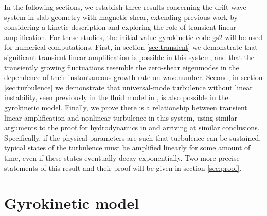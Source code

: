 \documentclass[12pt,superscriptaddress]{revtex4}
\begin{document}
In the following sections, we establish three results concerning the drift wave system in slab geometry
with magnetic shear,
extending previous work by considering a kinetic description and exploring the role of transient linear amplification.
For these studies, the initial-value gyrokinetic code gs2 \cite{gs2} will be used
for numerical computations.
First, in section \ref{sec:transient} we demonstrate that
significant transient linear amplification is possible in this system,
and that the transiently growing fluctuations
resemble the zero-shear eigenmodes
in the dependence of their instantaneous growth rate on wavenumber.
Second, in section \ref{sec:turbulence} we demonstrate that universal-mode turbulence without linear
instability, seen previously in the fluid model in \cite{Drake},
is also possible in the gyrokinetic model.
Finally, we prove there is a relationship between
transient linear amplification and nonlinear turbulence in this system,
using similar arguments to the proof for hydrodynamics in \cite{DelSoleNecessity}
and arriving at similar conclusions.
Specifically, if the physical parameters are such that turbulence can be sustained,
typical states of the turbulence must be amplified linearly for some amount of time, even if these states
eventually decay exponentially.
Two more precise statements of this result and their proof will be given in section \ref{sec:proof}.

\section{Gyrokinetic model}
\label{sec:model}
\end{document}
